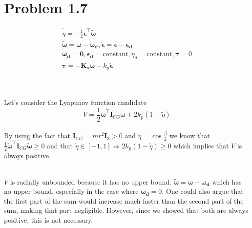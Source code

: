 \section*{Problem 1.7}

\begin{gather*}
    \dot{\tilde \eta} = -\frac{1}{2} \boldsymbol{\tilde \epsilon^\top} \boldsymbol{\tilde \omega} \\
    \boldsymbol{\tilde \omega} = \boldsymbol{\omega - \omega_d}, \boldsymbol{\tilde \epsilon} = \boldsymbol{\epsilon - \epsilon_d}\\
    \boldsymbol{\omega_d} = \mathbf{0}, \boldsymbol{\epsilon_d} = \text{constant}, \eta_d = \text{constant}, \boldsymbol{\tau} = 0 \\
    \boldsymbol{\tau} = -\mathbf{K}_d \boldsymbol{\omega} - k_p \boldsymbol{\tilde \epsilon}
\end{gather*}

\\ \\ Let's consider the Lyapunov function candidate
\begin{equation*}
    V = \frac{1}{2} { \boldsymbol{\tilde \omega}}^\top \mathbf{I}_{CG} \boldsymbol{\tilde \omega} + 2k_p(1 - \tilde \eta)
\end{equation*}
\\ By using the fact that $\mathbf{I}_{CG} = mr^2 \mathbf{I}_3 > 0$ and $\tilde \eta = \cos{\frac{\beta}{2}}$ we know that $\frac{1}{2} { \boldsymbol{\tilde \omega}}^\top \mathbf{I}_{CG} \boldsymbol{\tilde \omega} \geq 0$ and that $\tilde \eta \in [-1,1] \Rightarrow 2k_p(1 - \tilde \eta) \geq 0$ which implies that $V$ is always positive.

\\ $V$ is radially unbounded because it has no upper bound. $\boldsymbol{\tilde \omega} = \boldsymbol{\omega} - \boldsymbol{\omega_d}$ which has no upper bound, especially in the case where $\boldsymbol{\omega_d} = 0$. One could also argue that the first part of the sum would increase much faster than the second part of the sum, making that part negligible. However, since we showed that both are always positive, this is not necessary.



